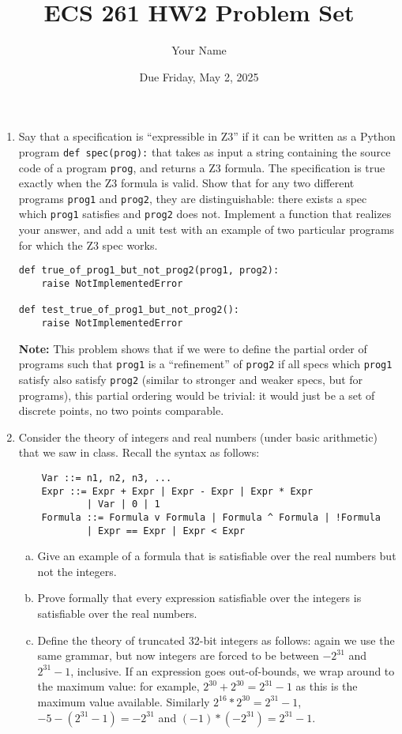 \documentclass{article}
\begin{document}
\title{ECS 261 HW2 Problem Set}
\author{Your Name}
\date{Due Friday, May 2, 2025}

\maketitle

\begin{enumerate}
\item
Say that a specification is ``expressible in Z3'' if it can be written as a Python program \texttt{def spec(prog):} that takes as input a string containing the source code of a program \texttt{prog}, and returns a Z3 formula.
The specification is true exactly when the Z3 formula is valid.
Show that for any two different programs \texttt{prog1} and \texttt{prog2},
they are distinguishable: there exists a spec which \texttt{prog1} satisfies and \texttt{prog2} does not.
Implement a function that realizes your answer, and add a unit test with an example of two particular programs for which the Z3 spec works.
\begin{verbatim}
def true_of_prog1_but_not_prog2(prog1, prog2):
    raise NotImplementedError

def test_true_of_prog1_but_not_prog2():
    raise NotImplementedError
\end{verbatim}

\textbf{Note:}
This problem shows that if we were to define the partial order of programs such that \texttt{prog1}
is a ``refinement'' of \texttt{prog2} if all specs which \texttt{prog1} satisfy also satisfy \texttt{prog2} (similar to stronger and weaker specs, but for programs), this partial ordering would be trivial: it would just be a set of discrete points, no two points comparable.

\item
Consider the theory of integers and real numbers (under basic arithmetic) that we saw in class.
Recall the syntax as follows:
\begin{verbatim}
    Var ::= n1, n2, n3, ...
    Expr ::= Expr + Expr | Expr - Expr | Expr * Expr
            | Var | 0 | 1
    Formula ::= Formula v Formula | Formula ^ Formula | !Formula
            | Expr == Expr | Expr < Expr
\end{verbatim}

\begin{enumerate}[(a)]
\item Give an example of a formula that is satisfiable over the real numbers but not the integers.
\item Prove formally that every expression satisfiable over the integers is satisfiable over the real numbers.
\item Define the theory of truncated 32-bit integers as follows: again we use the same grammar, but now integers are forced to be between $-2^{31}$ and $2^{31} - 1$, inclusive. If an expression goes out-of-bounds, we wrap around to the maximum value: for example, $2^{30} + 2^{30} = 2^{31} - 1$ as this is the maximum value available. Similarly $2^{16} * 2^{30} = 2^{31} - 1$, $-5 - (2^{31} - 1) = -2^{31}$ and $(-1) * (-2^{31}) = 2^{31} - 1$.


\end{enumerate}
\end{enumerate}
\end{document}
